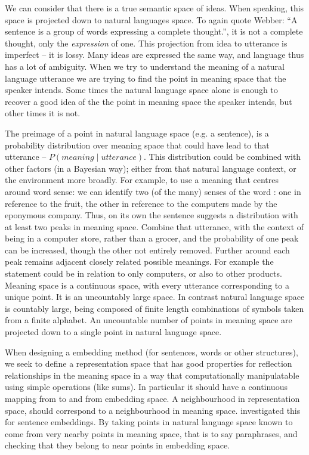 \documentclass{book}
\begin{document}
We can consider that there is a true semantic space of ideas.
When speaking, this space is projected down to natural languages space.
To again quote Webber: ``A sentence is a group of words expressing a complete thought.'', it is not a complete thought, only the \emph{expression} of one.
This projection from idea to utterance is imperfect -- it is lossy.
Many ideas are expressed the same way, and language thus has a lot of ambiguity.
When we try to understand the meaning of a natural language utterance we are trying to find the point in meaning space that the speaker intends.
Some times the natural language space alone is enough to recover a good idea of the the point in meaning space the speaker intends,
but other times it is not.

The preimage of a point in natural language space (e.g. a sentence),
is a probability distribution over meaning space that could have lead to that utterance -- $P(meaning \mid utterance)$.
This distribution could be combined with other factors (in a Bayesian way); either from that natural language context, or the environment more broadly.
For example, to use a meaning that centres around word sense:
we can identify two (of the many) senses of the word :
one in reference to the fruit, the other in reference to the computers made by the eponymous company.
Thus, on its own the sentence 
suggests a distribution with at least two peaks in meaning space.
Combine that utterance, with the context of being in a computer store, rather than a grocer, and the probability of one peak can be increased, though  the other not entirely removed.
Further around each peak remains adjacent closely related possible meanings.
For example the statement could be in relation to only computers, or also to other products.
Meaning space is a continuous space, with every utterance corresponding to a unique point. It is an uncountably large space.
In contrast natural language space is countably large, being composed of finite length combinations of symbols taken from a finite alphabet.
An uncountable number of points in meaning space are projected down to a single point in natural language space.


When designing a embedding method (for sentences, words or other structures),
we seek to define a representation space
that has good properties for reflection relationships in the meaning space in a way that computationally manipulatable using simple operations (like sums).
In particular it should have a continuous mapping from to and from embedding space.
A neighbourhood in representation space, should correspond to a neighbourhood in meaning space.
 investigated this for sentence embeddings.
By taking points in natural language space known to come from very nearby points in meaning space, that is to say paraphrases,
and checking that they belong to near points in embedding space.
\end{document}
